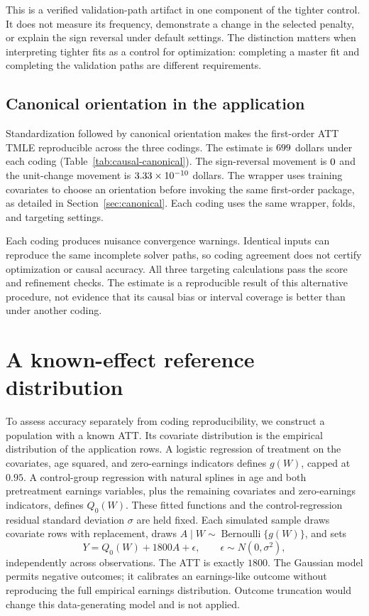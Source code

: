 \documentclass[11pt]{article}
\theoremstyle{definition}
\theoremstyle{remark}
\begin{document}
This is a verified validation-path artifact in one component of the
tighter control. It does not measure its frequency, demonstrate a change
in the selected penalty, or explain the sign reversal under default
settings. The distinction matters when interpreting tighter fits as a
control for optimization: completing a master fit and completing the
validation paths are different requirements.

\subsection{Canonical orientation in the application}

Standardization followed by canonical orientation makes the first-order
ATT TMLE reproducible across the three codings. The estimate is
$699$ dollars under each coding (Table~\ref{tab:causal-canonical}).
The sign-reversal movement is $0$ and the unit-change
movement is $3.33\times10^{-10}$ dollars. The wrapper uses training
covariates to choose an orientation before invoking the same first-order
package, as detailed in Section~\ref{sec:canonical}. Each coding uses the
same wrapper, folds, and targeting settings.

Each coding produces \CanonicalWarnings{} nuisance convergence warnings.
Identical inputs can reproduce the same incomplete solver paths, so coding
agreement does not certify optimization or causal accuracy. All three
targeting calculations pass the score and refinement checks. The estimate
is a reproducible result of this alternative procedure, not evidence that
its causal bias or interval coverage is better than under another coding.



\section{A known-effect reference distribution}\label{sec:known-effect}

To assess accuracy separately from coding reproducibility, we construct a
population with a known ATT. Its covariate distribution is the empirical
distribution of the \CausalN{} application rows. A logistic regression of
treatment on the covariates, age squared, and zero-earnings indicators defines
$g(W)$, capped at $0.95$. A control-group regression with natural splines in
age and both pretreatment earnings variables, plus the remaining covariates
and zero-earnings indicators, defines $Q_0(W)$. These fitted functions and the
control-regression residual standard deviation $\sigma$ are held fixed.
Each simulated sample draws covariate rows with replacement, draws
$A\mid W\sim\operatorname{Bernoulli}\{g(W)\}$, and sets
\[
 Y=Q_0(W)+1800A+\epsilon,\qquad
 \epsilon\sim N(0,\sigma^2),
\]
independently across observations. The ATT is exactly $1800$. The Gaussian
model permits negative outcomes; it calibrates an earnings-like outcome
without reproducing the full empirical earnings distribution. Outcome
truncation would change this data-generating model and is not applied.
\end{document}

